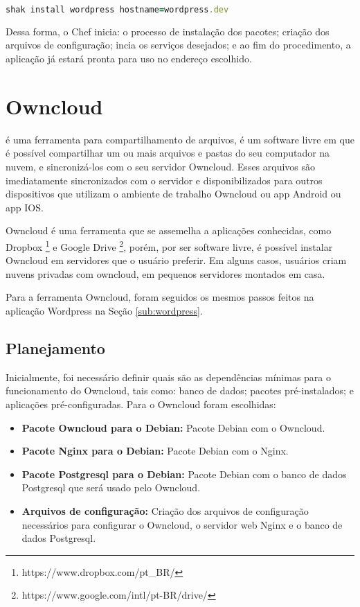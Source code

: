 \begin{lstlisting}[language=Ruby,label=dice_index,caption={Exemplo de exexução de instalação do wordpress com shak}]
shak install wordpress hostname=wordpress.dev
\end{lstlisting}

Dessa forma, o Chef inicia: o processo de instalação dos pacotes; criação dos arquivos
de configuração; incia os serviços desejados; e ao fim do procedimento, a aplicação
já estará pronta para uso no endereço escolhido.

\section{Owncloud}
\label{sub:owncloud}

 é uma ferramenta para compartilhamento de arquivos, é um software 
livre em que é possível compartilhar
um ou mais arquivos e pastas do seu computador na nuvem, e sincronizá-los com o seu
servidor Owncloud. Esses arquivos são imediatamente sincronizados com o servidor
e disponibilizados para outros dispositivos que utilizam o ambiente de trabalho
Owncloud ou app Android ou app IOS.

Owncloud é uma ferramenta que se assemelha a aplicações conhecidas, como Dropbox
\footnote{https://www.dropbox.com/pt\_BR/} e Google Drive \footnote{https://www.google.com/intl/pt-BR/drive/}, porém, por ser software livre, é possível instalar Owncloud em servidores
que o usuário preferir. Em alguns casos, usuários criam nuvens privadas com 
owncloud, em pequenos servidores montados em casa.

Para a ferramenta Owncloud, foram seguidos os mesmos passos feitos na aplicação
Wordpress na Seção 
\ref{sub:wordpress}.

\subsection{Planejamento}

Inicialmente, foi necessário definir quais são as dependências
mínimas para o funcionamento do Owncloud, tais como: banco de dados; pacotes
pré-instalados; e aplicações pré-configuradas. Para o Owncloud foram escolhidas:

\begin{itemize}
   \item \textbf{Pacote Owncloud para o Debian:} Pacote Debian com o Owncloud.
   \item \textbf{Pacote Nginx para o Debian:} Pacote Debian com o Nginx.
   \item \textbf{Pacote Postgresql para o Debian:} Pacote Debian com o banco de dados Postgresql
   que será usado pelo Owncloud.
   \item \textbf{Arquivos de configuração:} Criação dos arquivos de configuração
   necessários para configurar o Owncloud, o servidor web Nginx e o banco de dados
   Postgresql.
\end{itemize}

